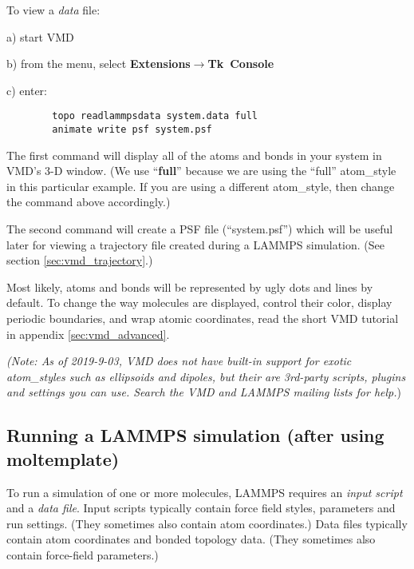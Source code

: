 \documentclass[11pt]{article}
\begin{document}
To view a \textit{data} file:
\begin{list}{}
\item a) start VMD
\item b) from the menu, select 
         \textbf{Extensions}$\rightarrow$\mbox{\textbf{Tk Console}} 
\item c) enter:
\end{list}
\begin{verbatim}
        topo readlammpsdata system.data full
        animate write psf system.psf
\end{verbatim}
\begin{list}{}
\item The first command will display all of the atoms and bonds in your system
in VMD's 3-D window.  (We use ``\textbf{full}'' because we are using the 
``full'' atom\_style in this particular example.  If you are using a different 
atom\_style, then change the command above accordingly.)
\item The second command
will create a PSF file (``system.psf'') which will 
be useful later for viewing a trajectory file created 
during a LAMMPS simulation.
(See section \ref{sec:vmd_trajectory}.)
\end{list}

Most likely, atoms and bonds will be represented by 
ugly dots and lines by default. 
To change the way molecules are displayed, control their color, 
display periodic boundaries, and wrap atomic coordinates,  
read the short VMD tutorial in appendix \ref{sec:vmd_advanced}.

\textit{(Note:
As of 2019-9-03, 
VMD does not have built-in support for exotic atom\_styles 
such as ellipsoids and dipoles, but their are 3rd-party scripts, plugins 
and settings you can use. Search the VMD and LAMMPS mailing lists 
for help.})



\subsection{Running a LAMMPS simulation (after using moltemplate)}
\label{sec:run}
To run a simulation of one or more molecules, 
LAMMPS requires an \textit{input script} and a \textit{data file}.
Input scripts typically contain
force field styles, parameters and run settings.
(They sometimes also contain atom coordinates.)
Data files typically contain atom coordinates and bonded topology data.
(They sometimes also contain force-field parameters.)
\end{document}
